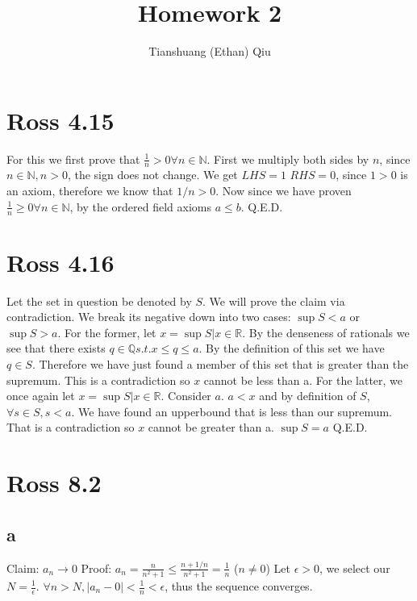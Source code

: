 \documentclass[12pt]{article}
\author{Tianshuang (Ethan) Qiu}
\newcommand{\N}{\mathbb{N}}
\newcommand{\R}{\mathbb{R}}
\newcommand{\Q}{\mathbb{Q}}
\begin{document}
\title{Homework 2}
\maketitle
\newpage

\section{Ross 4.15}
For this we first prove that $\frac{1}{n}>0 \forall n \in \N$. First we multiply both sides by $n$, since $n \in \N, n > 0$, the sign does not change.
\newline
We get $LHS = 1$ $RHS = 0$, since $1 > 0$ is an axiom, therefore we know that $1/n > 0$.
\newline
Now since we have proven $\frac{1}{n} \geq 0 \forall n \in \N$, by the ordered field axioms $a \leq b$.
\newline
Q.E.D.
\newpage


\section{Ross 4.16}
Let the set in question be denoted by $S$. We will prove the claim via contradiction. We break its negative down into two cases: $\sup S < a$ or $\sup S > a$.
\newline
For the former, let $x = \sup S | x \in \R$. By the denseness of rationals we see that there exists $q \in \Q s.t. x \leq q \leq a$. By the definition of this set we have $q \in S$. Therefore we have just found a member of this set that is greater than the supremum. This is a contradiction so $x$ cannot be less than a.
\newline
For the latter, we once again let $x = \sup S | x \in \R$. Consider $a$. $a<x$ and by definition of $S$, $\forall s \in S, s<a$. We have found an upperbound that is less than our supremum. That is a contradiction so $x$ cannot be greater than a.
\newline
$\sup S = a$ Q.E.D.
\newpage

\section{Ross 8.2}
\subsection{a}
Claim: $a_n \to 0$
\newline
Proof: $a_n = \frac{n}{n^2+1} \leq \frac{n+1/n}{n^2+1} = \frac{1}{n}$ ($n \neq 0$)
\newline
Let $\epsilon > 0$, we select our $N = \frac{1}{\epsilon}$. $\forall n>N, |a_n-0| < \frac{1}{n} < \epsilon$, thus the sequence converges.
\end{document}
